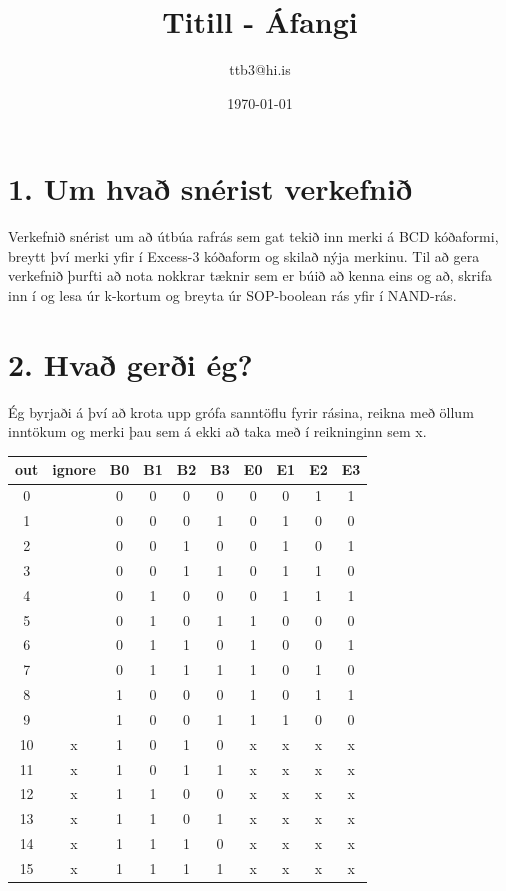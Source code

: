 \documentclass{article}
\title{Titill - Áfangi}
\author{ttb3@hi.is}
\date{\today}
\begin{document}
\maketitle


\section*{1. Um hvað snérist verkefnið}
Verkefnið snérist um að útbúa rafrás sem gat tekið inn merki á BCD kóðaformi, breytt því merki yfir í Excess-3 kóðaform og skilað nýja merkinu.
Til að gera verkefnið þurfti að nota nokkrar tæknir sem er búið að kenna eins og að, skrifa inn í og lesa úr k-kortum og breyta úr SOP-boolean rás yfir í NAND-rás.

\section*{2. Hvað gerði ég?}

Ég byrjaði á því að krota upp grófa sanntöflu fyrir rásina, reikna með öllum inntökum og merki þau sem á ekki að taka með í reikninginn sem x.
\begin{center}
    \begin{tabular}{|c|c|c|c|c|c|c|c|c|c|}
        \hline
        out&ignore&B0&B1&B2&B3&E0&E1&E2&E3\\
        \hline
        0 & &0&0&0&0&0&0&1&1\\
        \hline
        1 & &0&0&0&1&0&1&0&0\\
        \hline
        2 & &0&0&1&0&0&1&0&1\\
        \hline
        3 & &0&0&1&1&0&1&1&0\\
        \hline
        4 & &0&1&0&0&0&1&1&1\\
        \hline
        5 & &0&1&0&1&1&0&0&0\\
        \hline
        6 & &0&1&1&0&1&0&0&1\\
        \hline
        7 & &0&1&1&1&1&0&1&0\\
        \hline
        8 & &1&0&0&0&1&0&1&1\\
        \hline
        9 & &1&0&0&1&1&1&0&0\\
        \hline
        10&x&1&0&1&0&x&x&x&x\\
        \hline
        11&x&1&0&1&1&x&x&x&x\\
        \hline
        12&x&1&1&0&0&x&x&x&x\\
        \hline
        13&x&1&1&0&1&x&x&x&x\\
        \hline
        14&x&1&1&1&0&x&x&x&x\\
        \hline
        15&x&1&1&1&1&x&x&x&x\\
        \hline
    \end{tabular}
\end{center}
\end{document}
